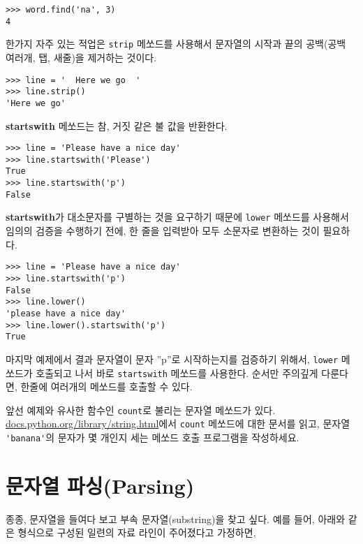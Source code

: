 \beforeverb
\begin{verbatim}
>>> word.find('na', 3)
4
\end{verbatim}
\afterverb
%

한가지 자주 있는 적업은 {\tt strip} 메쏘드를 사용해서 문자열의 시작과 끝의 공백(공백 여러개, 탭, 새줄)을 제거하는 것이다.

\beforeverb
\begin{verbatim}
>>> line = '  Here we go  '
>>> line.strip()
'Here we go'
\end{verbatim}
\afterverb
%

{\bf startswith} 메쏘드는 참, 거짓 같은 불 값을 반환한다.

\beforeverb
\begin{verbatim}
>>> line = 'Please have a nice day'
>>> line.startswith('Please')
True
>>> line.startswith('p')
False
\end{verbatim}
\afterverb
%

{\bf startswith}가 대소문자를 구별하는 것을 요구하기 때문에 {\tt lower} 메쏘드를 사용해서 임의의 검증을 수행하기 전에, 
한 줄을 입력받아 모두 소문자로 변환하는 것이 필요하다.

\beforeverb
\begin{verbatim}
>>> line = 'Please have a nice day'
>>> line.startswith('p')
False
>>> line.lower()
'please have a nice day'
>>> line.lower().startswith('p')
True
\end{verbatim}
\afterverb
%

마지막 예제에서 결과 문자열이 문자 ''p''로 시작하는지를 검증하기 위해서, 
{\tt lower} 메쏘드가 호출되고 나서 바로 {\tt startswith} 메쏘드를 사용한다.
순서만 주의깊게 다룬다면, 한줄에 여러개의 메쏘드를 호출할 수 있다.

\begin{ex}

앞선 예제와 유사한 함수인 {\tt count}로 불리는 문자열 메쏘드가 있다.
\url{docs.python.org/library/string.html}에서 {\tt count} 메쏘드에 대한 문서를 읽고,
문자열 \verb"'banana'"의 문자가 몇 개인지 세는 메쏘드 호출 프로그램을 작성하세요.

\end{ex}

\section{문자열 파싱(Parsing)}

종종, 문자열을 들여다 보고 부속 문자열(substring)을 찾고 싶다. 예를 들어,
아래와 같은 형식으로 구성된 일련의 자료 라인이 주어졌다고 가정하면,

